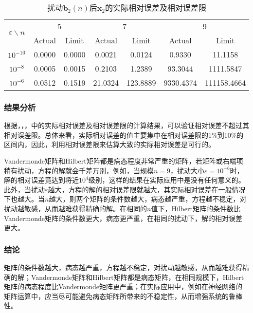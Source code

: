 \documentclass[12pt,a4paper]{article}
\begin{document}
\begin{table}
    \centering
    \caption{扰动$\boldsymbol{b}_2(n)$后$\boldsymbol{x}_2$的实际相对误差及相对误差限}
    \label{tab:ex1_b2_err}
    \begin{tabular}{c|cc|cc|cc}
        \toprule
        \multirow{2}{*}{\(\varepsilon \backslash n\)} & \multicolumn{2}{c}{5} & \multicolumn{2}{|c}{7} & \multicolumn{2}{|c}{9}\tabularnewline
        \cline{2-7}
        & Actual & Limit & Actual & Limit & Actual & Limit\tabularnewline
        \midrule
        \(10^{-10}\) & 0.0000 & 0.0000 & 0.0021 & 0.0124 & 0.9330 &
        11.1158\tabularnewline
        \(10^{-8}\) & 0.0005 & 0.0015 & 0.2103 & 1.2389 & 93.3044 &
        1111.5847\tabularnewline
        \(10^{-6}\) & 0.0512 & 0.1519 & 21.0324 & 123.8889 & 9330.4374 &
        111158.4664\tabularnewline
        \bottomrule
    \end{tabular}
\end{table}

\subsubsection{结果分析}

根据，，，中的实际相对误差及相对误差限的计算结果，可以验证相对误差不超过其相对误差限。总体来看，实际相对误差的值主要集中在相对误差限的1\%到10\%的区间内，因此，利用相对误差限来估算大致的实际相对误差是可行的。

Vandermonde矩阵和Hilbert矩阵都是病态程度非常严重的矩阵，若矩阵或右端项稍有扰动，方程的解就会千差万别，例如，当规模$n=9$，扰动大小$\varepsilon = 10^{-6}$时，解的相对误差竟达到将近$10^4$级别，这样的结果在实际应用中是没有任何意义的。此外，当扰动$\varepsilon$越大，方程的解的相对误差限就越大，其实际相对误差在一般情况下也越大。当$n$越大，则两个矩阵的条件数越大，病态越严重，方程越不稳定，对扰动越敏感，从而越难获得精确的解。在相同的$n$值下，Hilbert矩阵的条件数比Vandermonde矩阵的条件数更大，病态更严重，在相同的扰动下，解的相对误差更大。

\subsubsection{结论}

矩阵的条件数越大，病态越严重，方程越不稳定，对扰动越敏感，从而越难获得精确的解；Vandermonde矩阵和Hilbert矩阵都是病态矩阵，在相同规模下，Hilbert矩阵的病态程度比Vandermonde矩阵更严重；在实际应用中，例如在神经网络的矩阵运算中，应当尽可能避免病态矩阵所带来的不稳定性，从而增强系统的鲁棒性。
\end{document}

